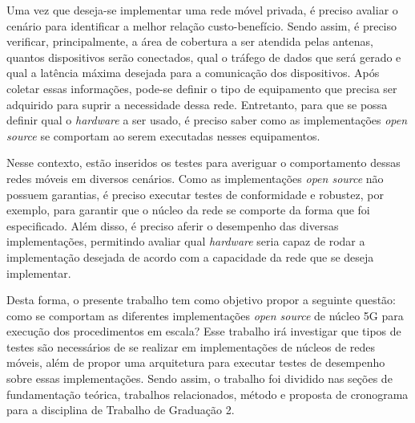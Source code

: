 Uma vez que deseja-se implementar uma rede móvel privada, é preciso avaliar o cenário para identificar a melhor relação custo-benefício.
Sendo assim, é preciso verificar, principalmente, a área de cobertura a ser atendida pelas antenas, quantos dispositivos serão conectados, qual o tráfego de dados que será gerado e qual a latência máxima desejada para a comunicação dos dispositivos.
Após coletar essas informações, pode-se definir o tipo de equipamento que precisa ser adquirido para suprir a necessidade dessa rede.
Entretanto, para que se possa definir qual o \textit{hardware} a ser usado, é preciso saber como as implementações \textit{open source} se comportam ao serem executadas nesses equipamentos.

Nesse contexto, estão inseridos os testes para averiguar o comportamento dessas redes móveis em diversos cenários.
Como as implementações \textit{open source} não possuem garantias, é preciso executar testes de conformidade e robustez, por exemplo, para garantir que o núcleo da rede se comporte da forma que foi especificado.
Além disso, é preciso aferir o desempenho das diversas implementações, permitindo avaliar qual \textit{hardware} seria capaz de rodar a implementação desejada de acordo com a capacidade da rede que se deseja implementar.

Desta forma, o presente trabalho tem como objetivo propor a seguinte questão: como se comportam as diferentes implementações \textit{open source} de núcleo 5G para execução dos procedimentos em escala?
Esse trabalho irá investigar que tipos de testes são necessários de se realizar em implementações de núcleos de redes móveis, além de propor uma arquitetura para executar testes de desempenho sobre essas implementações.
Sendo assim, o trabalho foi dividido nas seções de fundamentação teórica, trabalhos relacionados, método e proposta de cronograma para a disciplina de Trabalho de Graduação 2.
